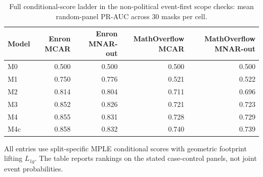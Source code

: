 \begin{table}[tbp]
\centering
\small
\caption{Full conditional-score ladder in the non-political event-first scope checks: mean random-panel PR-AUC across 30 masks per cell.}
\label{tab:scope-ladder}
\begin{tabular}{lrrrr}
\toprule
Model & Enron MCAR & Enron MNAR-out & MathOverflow MCAR & MathOverflow MNAR-out \\
\midrule
M0 & 0.500 & 0.500 & 0.500 & 0.500 \\
M1 & 0.750 & 0.776 & 0.521 & 0.522 \\
M2 & 0.814 & 0.804 & 0.711 & 0.696 \\
M3 & 0.852 & 0.826 & 0.721 & 0.723 \\
M4 & 0.855 & 0.831 & 0.728 & 0.729 \\
M4c & 0.858 & 0.832 & 0.740 & 0.739 \\
\bottomrule
\end{tabular}
\par\vspace{2pt}\footnotesize All entries use split-specific MPLE conditional scores with geometric footprint lifting $L_{1g}$. The table reports rankings on the stated case-control panels, not joint event probabilities.
\end{table}
